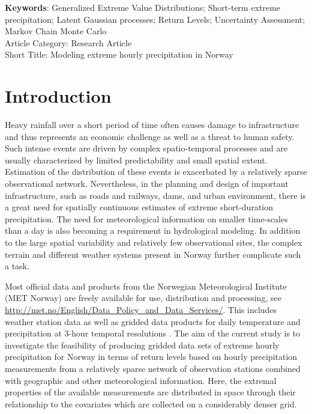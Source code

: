 \documentclass[11pt,english]{article}
\begin{document}
\noindent\textbf{Keywords}: Generalized Extreme Value Distributions; Short-term extreme precipitation; Latent Gaussian processes; Return Levels; Uncertainty Assessment; Markov Chain Monte Carlo\\

\noindent Article Category: Research Article\\
Short Title: Modeling extreme hourly precipitation in Norway\\

\newpage

\section{Introduction}

Heavy rainfall over a short period of time often causes damage to infrastructure and thus represents an economic challenge as well as a threat to human safety. Such intense events are driven by complex spatio-temporal processes and are usually characterized by limited predictability and small spatial extent.  Estimation of the distribution of these events is exacerbated by a relatively sparse observational network. Nevertheless, in the planning and design of important infrastructure, such as roads and railways, dams, and urban environment, there is a great need for spatially continuous estimates of extreme short-duration precipitation. The need for meteorological information on smaller time-scales than a day is also becoming a requirement in hydrological modeling. In addition to the large spatial variability and relatively few observational sites, the complex terrain and different weather systems present in Norway further complicate such a task. 

Most official data and products from the Norwegian Meteorological Institute (MET Norway) are freely available for use, distribution and processing, see \url{http://met.no/English/Data_Policy_and_Data_Services/}.  This includes weather station data as well as gridded data products for daily temperature and precipitation at 3-hour temporal resolutions \citep{Tveitoetal2002, Mohr2009, Janssonetal2007, VormoorandSkaugen2013}.  The aim of the current study is to investigate the feasibility of producing gridded data sets of extreme hourly precipitation for Norway in terms of return levels based on hourly precipitation measurements from a relatively sparse network of observation stations combined with geographic and other meteorological information.  Here, the extremal properties of the available measurements are distributed in space through their relationship to the covariates which are collected on a considerably denser grid.
\end{document}
